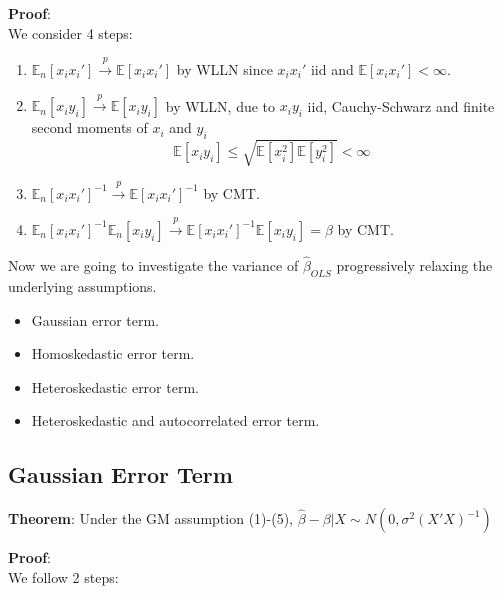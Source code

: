 \documentclass[12pt,]{book}
\providecommand{\tightlist}{%
  \setlength{\itemsep}{0pt}\setlength{\parskip}{0pt}}
\begin{document}
\textbf{Proof}:\\
We consider 4 steps:

\begin{enumerate}
\def\labelenumi{\arabic{enumi}.}
\tightlist
\item
  \(\mathbb E_n [x_i x_i'] \xrightarrow{p} \mathbb E [x_i x_i']\) by WLLN since \(x_i x_i'\) iid and \(\mathbb E[x_i x_i'] < \infty\).
\item
  \(\mathbb E_n [x_i y_i] \xrightarrow{p} \mathbb E [x_i y_i]\) by WLLN, due to \(x_i y_i\) iid, Cauchy-Schwarz and finite second moments of \(x_i\) and \(y_i\)
  \[
     \mathbb E \left[ x_i y_i \right]  \leq \sqrt{ \mathbb E[x_i^2] \mathbb E[y_i^2]} < \infty
    \]
\item
  \(\mathbb E_n [x_i x_i']^{-1} \xrightarrow{p} \mathbb E [x_i x_i']^{-1}\) by CMT.
\item
  \(\mathbb E_n [x_i x_i']^{-1} \mathbb E_n [x_i y_i] \xrightarrow{p} \mathbb E [x_i x_i']^{-1} \mathbb E [x_i y_i] = \beta\) by CMT.
  \[\tag*{$\blacksquare$}\]
\end{enumerate}

Now we are going to investigate the variance of \(\hat \beta _ {OLS}\) progressively relaxing the underlying assumptions.

\begin{itemize}
\tightlist
\item
  Gaussian error term.
\item
  Homoskedastic error term.
\item
  Heteroskedastic error term.
\item
  Heteroskedastic and autocorrelated error term.
\end{itemize}

\hypertarget{gaussian-error-term}{%
\subsection{Gaussian Error Term}\label{gaussian-error-term}}

\textbf{Theorem}:
Under the GM assumption (1)-(5), \(\hat \beta - \beta |X \sim N(0, \sigma^2 (X'X)^{-1})\)

\textbf{Proof}:\\
We follow 2 steps:
\end{document}

